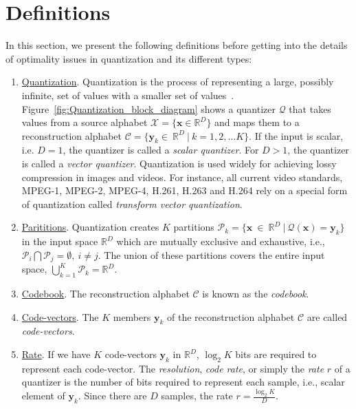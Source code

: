 \section{Definitions}
\label{sec:definitions}
In this section, we present the following definitions before getting into the details of optimality issues in quantization and its different types:

\begin{enumerate}
\item \underline{Quantization}.  Quantization is the process of representing a large, possibly infinite, set of values with a smaller set of values~\cite{2005_BOOK_DataCompression_Sayood}.  Figure~\ref{fig:Quantization_block_diagram} shows a quantizer $\mathcal{Q}$ that takes values from a source alphabet $\mathcal{X}=\{\mathbf{x} \in \mathbb{R}^D\}$ and maps them to a reconstruction alphabet $\mathcal{C}=\{\mathbf{y}_k \in \ \mathbb{R}^D \ | \ k=1,2, \ldots K\}$.  If the input is scalar, i.e. $D=1$, the quantizer is called a \emph{scalar quantizer}.  For $D>1$, the quantizer is called a \emph{vector quantizer}.  Quantization is used widely for achieving lossy compression in images and videos.  For instance, all current video standards, MPEG-1, MPEG-2, MPEG-4, H.261, H.263 and H.264 rely on a special form of quantization called \emph{transform vector quantization}.

\item \underline{Parititions}.  Quantization creates $K$ partitions $\mathcal{P}_k = \{\mathbf{x} \ \in \ \mathbb{R}^D \ | \ \mathcal{Q}(\mathbf{x}) = \mathbf{y}_k\}$ in the input space $\mathbb{R}^D$ which are mutually exclusive and exhaustive, i.e., $\mathcal{P}_i \bigcap \mathcal{P}_j = \emptyset, \ i \neq j$.  The union of these partitions covers the entire input space, $\bigcup\limits_{k=1}^{K} \mathcal{P}_k=\mathbb{R}^D$.

\item \underline{Codebook}. The reconstruction alphabet $\mathcal{C}$ is known as the \emph{codebook}.  

\item \underline{Code-vectors}.  The $K$ members $\mathbf{y}_k$ of the reconstruction alphabet $\mathcal{C}$ are called \emph{code-vectors}.    

\item \underline{Rate}.  If we have $K$ code-vectors $\mathbf{y}_k$ in $\mathbb{R}^D$, $\log_2 K$ bits are required to represent each code-vector.   The \emph{resolution}, \emph{code rate}, or simply the \emph{rate} $r$ of a quantizer is the number of bits required to represent each sample, i.e., scalar element of $\mathbf{y}_k$.  Since there are $D$ samples, the rate $r=\frac{\log_2 K}{D}$.  


\end{enumerate}
